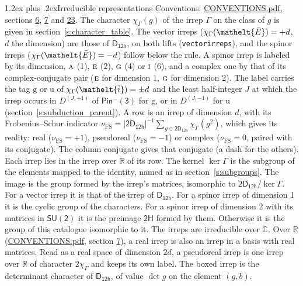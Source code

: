 \documentclass[10pt,a4paper]{article}
\makeatletter
\renewcommand\section{\@startsection{section}{1}{\z@}{-3ex plus -1ex minus -.2ex}%
  {1.2ex plus .2ex}{\normalfont\large\sffamily\bfseries\color{parttitle}}}
\numberwithin{equation}{section}
\newcommand{\eltfont}[1]{{\let\sigma\eltsigma\mathelt{#1}}}
\newcommand{\grp}[1]{\mathsf{#1}}
\newcommand{\irr}[1]{\text{\normalfont\scshape #1}}
\newcommand{\elt}[1]{\eltfont{#1}}
\newcommand{\ptag}[1]{\mathrm{#1}}
\newcommand{\irrJp}[2]{D^{(#1,#2)}}
\newcommand{\irchar}[1]{\chi_{#1}}
\newcommand{\fsind}{\nu_{\mathrm{FS}}}
\newcommand{\barred}[1]{\bar{#1}}
\newcommand{\lift}[1]{\tilde{#1}}
\makeatother
\begin{document}
\section{Irreducible representations}\label{s:irreps}
Conventions: \href{../../CONVENTIONS.pdf}{CONVENTIONS.pdf}, sections \href{../../../rotation/CONVENTIONS.pdf\#conv.6}{6}, \href{../../../rotation/CONVENTIONS.pdf\#conv.7}{7} and \href{../../CONVENTIONS.pdf\#conv.23}{23}.
\leavevmode\label{n:function.character}\label{n:irrep.Gamma}The character $\irchar{\Gamma}(g)$ of the irrep $\Gamma$ on the class of $g$ is given in section~\ref{s:character_table}. \label{n:index.dimension}The vector irreps ($\irchar{\Gamma}(\elt{\barred{E}}) = +d$, $d$ the dimension) are those of \href{../../../rotation/data/pdf/D12h.pdf}{$\grp{D_{12h}}$}, on both lifts (\texttt{vectorirreps}), and the spinor irreps ($\irchar{\Gamma}(\elt{\barred{E}}) = -d$) follow below the rule. A spinor irrep is labeled by its dimension, $\irr{a}$ (1), $\irr{e}$ (2), $\irr{g}$ (4) or $\irr{i}$ (6), and a complex one by that of its complex-conjugate pair ($\irr{e}$ for dimension 1, $\irr{g}$ for dimension 2). The label carries the tag $\ptag{g}$ or $\ptag{u}$ of $\irchar{\Gamma}(\elt{\lift{i}}) = \pm d$ and the least half-integer $J$ at which the irrep occurs in $\irrJp{J}{+1}$ of $\grp{Pin^{-}(3)}$ for $\ptag{g}$, or in $\irrJp{J}{-1}$ for $\ptag{u}$ (section~\ref{s:subduction_parent}).
\leavevmode\label{n:index.frobenius}\label{n:head.irrep}\label{n:head.reality}A row is an irrep of dimension $d$, with its Frobenius--Schur indicator $\fsind = |\grp{2D_{12h}}|^{-1}\allowbreak\sum_{g\in\grp{2D_{12h}}}\irchar{\Gamma}(g^2)$, which gives its reality: real ($\fsind = +1$), pseudoreal ($\fsind = -1$) or complex ($\fsind = 0$, paired with its conjugate). \label{n:head.conjugate}The column conjugate gives that conjugate (a dash for the others). \label{n:head.over.real}Each irrep lies in the irrep over $\mathbb{R}$ of its row. \label{n:head.kernel}The kernel $\ker\Gamma$ is the subgroup of the elements mapped to the identity, named as in section~\ref{s:subgroups}. \label{n:head.image}The image is the group formed by the irrep's matrices, isomorphic to $\grp{2D_{12h}}/\ker\Gamma$. For a vector irrep it is that of the irrep of \href{../../../rotation/data/pdf/D12h.pdf}{$\grp{D_{12h}}$}. For a spinor irrep of dimension 1 it is the cyclic group of the characters. For a spinor irrep of dimension 2 with its matrices in $\grp{SU(2)}$ it is the preimage $\grp{2H}$ formed by them. Otherwise it is the group of this catalogue isomorphic to it. The irreps are irreducible over $\mathbb{C}$. Over $\mathbb{R}$ (\href{../../CONVENTIONS.pdf}{CONVENTIONS.pdf}, section \href{../../../rotation/CONVENTIONS.pdf\#conv.7}{7}), a real irrep is also an irrep in a basis with real matrices. Read as a real space of dimension $2d$, a pseudoreal irrep is one irrep over $\mathbb{R}$ of character $2\irchar{\Gamma}$ and keeps its own label. \label{n:mark.determinant}The boxed irrep is the determinant character of \href{../../../rotation/data/pdf/D12h.pdf}{$\grp{D_{12h}}$}, of value $\det g$ on the element $(g, b)$.
\end{document}
